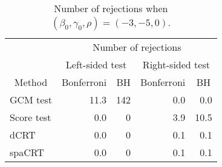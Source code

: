 \begin{table}[!h]
\centering
\caption{\label{tab:simulation_rejection_beta_-3_gamma_-5}Number of rejections when $(\beta_0,\gamma_0,\rho) = (-3, -5, 0)$.}
\centering
\begin{tabular}[t]{lrrrr}
\toprule
\multicolumn{1}{c}{ } & \multicolumn{4}{c}{Number of rejections} \\
\cmidrule(l{3pt}r{3pt}){2-5}
\multicolumn{1}{c}{ } & \multicolumn{2}{c}{Left-sided test} & \multicolumn{2}{c}{Right-sided test} \\
\cmidrule(l{3pt}r{3pt}){2-3} \cmidrule(l{3pt}r{3pt}){4-5}
\multicolumn{1}{c}{Method} & \multicolumn{1}{c}{Bonferroni} & \multicolumn{1}{c}{BH} & \multicolumn{1}{c}{Bonferroni} & \multicolumn{1}{c}{BH} \\
\cmidrule(l{3pt}r{3pt}){1-1} \cmidrule(l{3pt}r{3pt}){2-2} \cmidrule(l{3pt}r{3pt}){3-3} \cmidrule(l{3pt}r{3pt}){4-4} \cmidrule(l{3pt}r{3pt}){5-5}
GCM test & 11.3 & 142 & 0.0 & 0.0\\
Score test & 0.0 & 0 & 3.9 & 10.5\\
dCRT & 0.0 & 0 & 0.1 & 0.1\\
spaCRT & 0.0 & 0 & 0.1 & 0.1\\
\bottomrule
\end{tabular}
\end{table}
